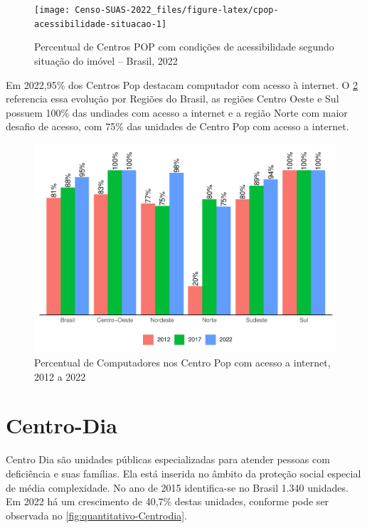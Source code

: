 \documentclass[
  brazilian]{report}
\begin{document}
\begin{figure}
\texttt{[image: Censo-SUAS-2022\_files/figure-latex/cpop-acessibilidade-situacao-1]} \caption[Percentual de Centros POP com condições de acessibilidade segundo situação do imóvel – Brasil, 2022]{Percentual de Centros POP com condições de acessibilidade segundo situação do imóvel – Brasil, 2022}\label{fig:cpop-acessibilidade-situacao}
\end{figure}

Em 2022,95\% dos Centros Pop destacam computador com acesso à internet.
O \cref{fig:cpop-internet-percentual} referencia essa evolução por
Regiões do Brasil, as regiões Centro Oeste e Sul possuem 100\% das
undiades com acesso a internet e a região Norte com maior desafio de
acesso, com 75\% das unidades de Centro Pop com acesso a internet.

\begin{figure}
\includegraphics{Censo-SUAS-2022_files/figure-latex/cpop-internet-percentual-1} \caption[Percentual de Computadores nos Centro Pop com acesso a internet, 2012 a 2022]{Percentual de Computadores nos Centro Pop com acesso a internet, 2012 a 2022}\label{fig:cpop-internet-percentual}
\end{figure}

\hypertarget{centro-dia}{%
\section{Centro-Dia}\label{centro-dia}}

Centro Dia são unidades públicas especializadas para atender pessoas com
deficiência e suas famílias. Ela está inserida no âmbito da proteção
social especial de média complexidade. No ano de 2015 identifica-se no
Brasil 1.340 unidades. Em 2022 há um crescimento de 40,7\% destas
unidades, conforme pode ser observada no
\cref{fig:quantitativo-Centrodia}.
\end{document}
